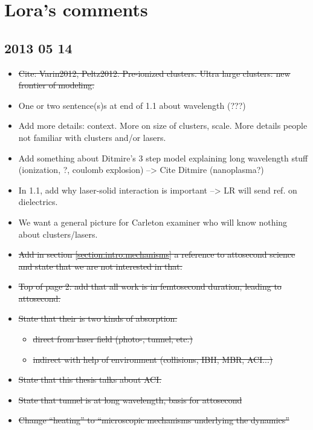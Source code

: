 \section*{Lora's comments}

\subsection*{2013 05 14}

\begin{itemize}
\item \sout{Cite: Varin2012, Peltz2012. Pre-ionized
clusters. Ultra large clusters: new frontier of modeling.}
\item One or two sentence(s)s at end of 1.1 about wavelength (???)
\item Add more details: context. More on size of clusters, scale. More details
people not familiar with clusters and/or lasers.
\item Add something about Ditmire's 3 step model explaining long wavelength stuff
(ionization, ?, coulomb explosion) --> Cite Ditmire (nanoplasma?)
\item In 1.1, add why laser-solid interaction is important --> LR will send ref.
on dielectrics.
\item We want a general picture for Carleton examiner who will know nothing about
clusters/lasers.
\item \sout{Add in section \ref{section:intro:mechanisms} a reference to
attosecond science and state that we are not interested in that.}
\item \sout{Top of page 2: add that all work is in femtosecond duration, leading to
attosecond.}
\item \sout{State that their is two kinds of absorption:}
    \begin{itemize}
    \item \sout{direct from laser field (photo-, tunnel, etc.)}
    \item \sout{indirect with help of environment (collisions, IBH, MBR, ACI...)}
    \end{itemize}
\item \sout{State that this thesis talks about ACI.}
\item \sout{State that tunnel is at long wavelength, basis for attosecond}
\item \sout{Change ``heating'' to ``microscopic mechanisms underlying the dynamics''}

\end{itemize}
